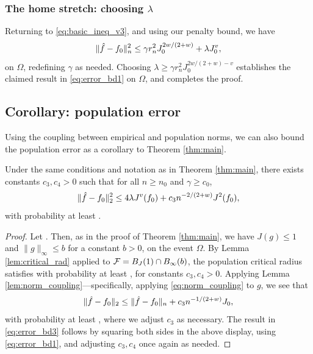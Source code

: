 \documentclass{article}
\begin{document}
\subsubsection{The home stretch: choosing $\lambda$}

Returning to \eqref{eq:basic_ineq_v3}, and using our penalty bound, we have 
\[
\|\hat{f} - f_0\|_n^2 \leq \gamma r_n^2 J_0^{2w/(2+w)} + \lambda J_0^v,
\]
on $\Omega$, redefining $\gamma$ as needed. Choosing $\lambda \geq \gamma r_n^2  
J_0^{2w/(2+w) - v}$ establishes the claimed result in \eqref{eq:error_bd1} on
$\Omega$, and completes the proof.    

\subsection{Corollary: population error}

Using the coupling between empirical and population norms, we can also bound the
population error as a corollary to Theorem \ref{thm:main}.

\begin{corollary}
\label{cor:main}
Under the same conditions and notation as in Theorem \ref{thm:main}, there
exists constants $c_3,c_4 > 0$ such that for all $n \geq n_0$ and $\gamma \geq
c_0$, 
\begin{equation}
\label{eq:error_bd3}
\|\hat{f} - f_0\|_2^2 \leq 4 \lambda J^v(f_0) + c_3 n^{-2/(2+w)} J^2(f_0),
\end{equation}
with probability at least .  

\end{corollary}

\begin{proof}
Let . Then, as in the proof of Theorem
\ref{thm:main}, we have $J(g) \leq 1$ and $\|g\|_\infty \leq b$ for a constant
$b>0$, on the event $\Omega$. By Lemma \ref{lem:critical_rad} applied to $\mathcal{F} = 
B_J(1) \cap B_\infty(b)$, the population critical radius satisfies
 with probability at least , for constants 
$c_3,c_4>0$. Applying Lemma \ref{lem:norm_coupling}---specifically, applying
\eqref{eq:norm_coupling} to $g$, we see that  
\[
\|\hat{f} - f_0\|_2 \leq \|\hat{f} - f_0\|_n + c_3 n^{-1/(2+w)} J_0,
\]
with probability at least , where we adjust $c_3$ as necessary. The result in
\eqref{eq:error_bd3} follows by squaring both sides in the above display, using
\eqref{eq:error_bd1}, and adjusting $c_3,c_4$ once again as needed.  
\end{proof}
\end{document}
